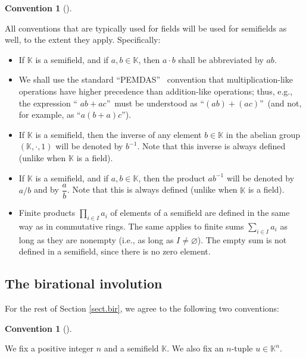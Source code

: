 \documentclass[numbers=enddot,12pt,final,onecolumn,notitlepage]{scrartcl}%
\theoremstyle{definition}
\newtheorem{conv}[theo]{Convention}
\newenvironment{convention}[1][]
{\begin{conv}[#1]\begin{leftbar}}
{\end{leftbar}\end{conv}}
\let\sumnonlimits\sum
\let\prodnonlimits\prod
\renewcommand{\sum}{\sumnonlimits\limits}
\renewcommand{\prod}{\prodnonlimits\limits}
\begin{document}
\begin{convention}
\label{conv.semifield.notations}All conventions that are typically used for
fields will be used for semifields as well, to the extent they apply. Specifically:

\begin{itemize}
\item If $\mathbb{K}$ is a semifield, and if $a,b\in\mathbb{K}$, then $a\cdot
b$ shall be abbreviated by $ab$.

\item We shall use the standard \textquotedblleft PEMDAS\textquotedblright%
\ convention that multiplication-like operations have higher precedence than
addition-like operations; thus, e.g., the expression \textquotedblleft%
$ab+ac$\textquotedblright\ must be understood as \textquotedblleft$\left(
ab\right)  +\left(  ac\right)  $\textquotedblright\ (and not, for example, as
\textquotedblleft$a\left(  b+a\right)  c$\textquotedblright).

\item If $\mathbb{K}$ is a semifield, then the inverse of any element
$b\in\mathbb{K}$ in the abelian group $\left(  \mathbb{K},\cdot,1\right)  $
will be denoted by $b^{-1}$. Note that this inverse is always defined (unlike
when $\mathbb{K}$ is a field).

\item If $\mathbb{K}$ is a semifield, and if $a,b\in\mathbb{K}$, then the
product $ab^{-1}$ will be denoted by $a/b$ and by $\dfrac{a}{b}$. Note that
this is always defined (unlike when $\mathbb{K}$ is a field).

\item Finite products $\prod_{i\in I}a_{i}$ of elements of a semifield are
defined in the same way as in commutative rings. The same applies to finite
sums $\sum_{i\in I}a_{i}$ as long as they are nonempty (i.e., as long as
$I\neq\varnothing$). The empty sum is not defined in a semifield, since there
is no zero element.
\end{itemize}
\end{convention}

\subsection{The birational involution}

For the rest of Section \ref{sect.bir}, we agree to the following two conventions:

\begin{convention}
\label{conv.bir.1}We fix a positive integer $n$ and a semifield $\mathbb{K}$.
We also fix an $n$-tuple $u\in\mathbb{K}^{n}$.
\end{convention}
\end{document}
